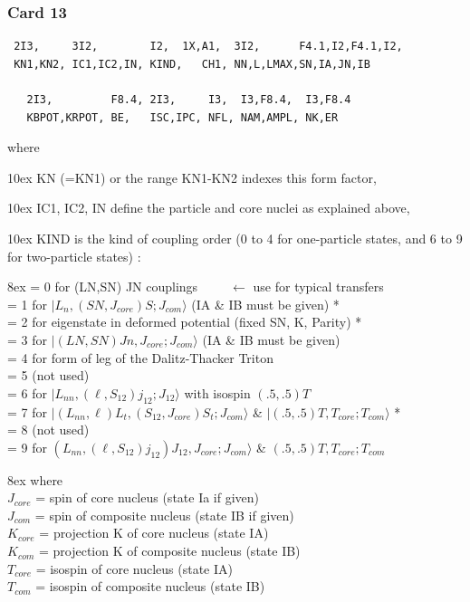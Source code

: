 \documentclass[11pt]{article}
\begin{document}
\subsubsection*{Card 13}
\begin{verbatim}
 2I3,     3I2,        I2,  1X,A1,  3I2,      F4.1,I2,F4.1,I2,
 KN1,KN2, IC1,IC2,IN, KIND,   CH1, NN,L,LMAX,SN,IA,JN,IB

   2I3,         F8.4, 2I3,     I3,  I3,F8.4,  I3,F8.4
   KBPOT,KRPOT, BE,   ISC,IPC, NFL, NAM,AMPL, NK,ER
\end{verbatim}
where

\hangindent 10ex
KN (=KN1) or the range KN1-KN2 indexes this form factor,

\hangindent 10ex
IC1, IC2, IN define the particle and core nuclei as explained above,

\hangindent 10ex
KIND is the kind of coupling order (0 to 4 for one-particle states, and
6 to 9 for two-particle states) :

\hangindent 8ex
= 0 for (LN,SN) JN couplings   ~ ~ ~$\leftarrow$ use for typical transfers\\
= 1 for $|L_{n}, (SN,J_{core})S ; J_{com}\rangle$  (IA \& IB must be given) *\\
= 2 for eigenstate in deformed potential (fixed SN, K, Parity)  *\\
= 3 for $|(LN,SN)Jn, J_{core}; J_{com}\rangle$    (IA \& IB must be given)\\
= 4 for form of leg of the Dalitz-Thacker Triton\\
= 5  (not used)\\
= 6 for $|L_{nn}, (\ell,S_{12})j_{12}; J_{12}\rangle$  with isospin $(.5,.5) T$\\
= 7 for $|(L_{nn},\ell)L_t, (S_{12},J_{core})S_t ;  J_{com}\rangle$ \& $|(.5,.5)T,T_{core};T_{com}\rangle$  *\\
= 8  (not used)\\
= 9 for $(L_{nn},(\ell,S_{12})j_{12})J_{12}, J_{core}; J_{com}\rangle$ \&
$(.5,.5)T,T_{core};T_{com}$

\hangindent 8ex  where
\\  $J_{core}$ = spin of core nucleus (state Ia if given)
\\  $J_{com}$  = spin of composite nucleus (state IB if given)
\\  $K_{core}$ = projection K of core nucleus (state IA)
\\  $K_{com}$  = projection K of composite nucleus (state IB)
\\  $T_{core}$ = isospin of core nucleus (state IA)
\\  $T_{com}$  = isospin of composite nucleus (state IB)
\end{document}
